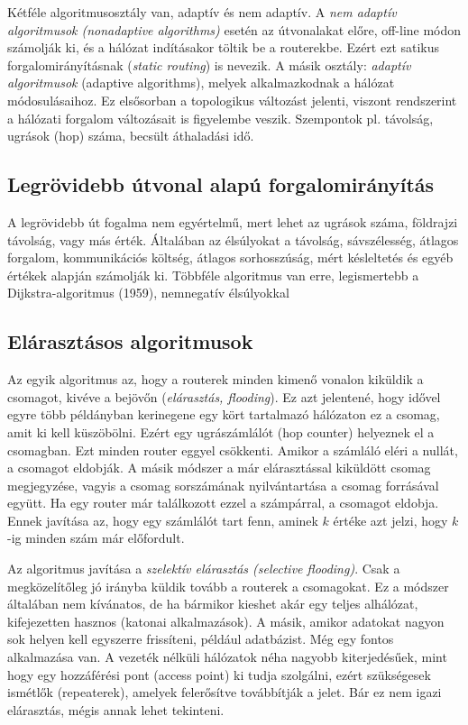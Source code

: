 \documentclass[fleqn,10pt,a4paper]{article}
\theoremstyle{magyar}
\begin{document}
  Kétféle algoritmusosztály van, adaptív és nem adaptív. A \emph{nem adaptív algoritmusok (nonadaptive algorithms)}
  esetén az útvonalakat előre, off-line módon számolják ki, és a hálózat indításakor töltik be a routerekbe. Ezért ezt
  satikus forgalomirányításnak (\emph{static routing}) is nevezik. A másik osztály: \emph{adaptív algoritmusok}
  (adaptive algorithms), melyek alkalmazkodnak a hálózat módosulásaihoz. Ez elsősorban a topologikus változást jelenti,
  viszont rendszerint a hálózati forgalom változásait is figyelembe veszik. Szempontok pl. távolság, ugrások (hop) száma,
  becsült áthaladási idő.

  \subsection{Legrövidebb útvonal alapú forgalomirányítás}
  A legrövidebb út fogalma nem egyértelmű, mert lehet az ugrások száma, földrajzi távolság, vagy más érték. Általában az
  élsúlyokat a távolság, sávszélesség, átlagos forgalom, kommunikációs költség, átlagos sorhosszúság, mért késleltetés
  és egyéb értékek alapján számolják ki. Többféle algoritmus van erre, legismertebb a Dijkstra-algoritmus (1959),
  nemnegatív élsúlyokkal
  
  \subsection{Elárasztásos algoritmusok}
  Az egyik algoritmus az, hogy a routerek minden kimenő vonalon kiküldik a csomagot, kivéve a bejövőn
  (\emph{elárasztás, flooding}). Ez azt jelentené, hogy idővel egyre több példányban kerinegene egy kört tartalmazó
  hálózaton ez a csomag, amit ki kell küszöbölni. Ezért egy ugrászámlálót (hop counter) helyeznek el a csomagban. Ezt
  minden router eggyel csökkenti. Amikor a számláló eléri a nullát, a csomagot eldobják. A másik módszer a már
  elárasztással kiküldött csomag megjegyzése, vagyis a csomag sorszámának nyilvántartása a csomag forrásával együtt. Ha
  egy router már találkozott ezzel a számpárral, a csomagot eldobja. Ennek javítása az, hogy egy számlálót tart fenn,
  aminek $k$ értéke azt jelzi, hogy $k$-ig minden szám már előfordult.

  Az algoritmus javítása a \emph{szelektív elárasztás (selective flooding)}. Csak a megközelítőleg jó irányba küldik
  tovább a routerek a csomagokat.
  Ez a módszer általában nem kívánatos, de ha bármikor kieshet akár egy teljes alhálózat, kifejezetten hasznos (katonai
  alkalmazások). A másik, amikor adatokat nagyon sok helyen kell egyszerre frissíteni, például adatbázist. Még egy
  fontos alkalmazása van. A vezeték nélküli hálózatok néha nagyobb kiterjedésűek, mint hogy egy hozzáférési pont (access
  point) ki tudja szolgálni, ezért szükségesek ismétlők (repeaterek), amelyek felerősítve továbbítják a jelet. Bár ez
  nem igazi elárasztás, mégis annak lehet tekinteni.
  
\end{document}
